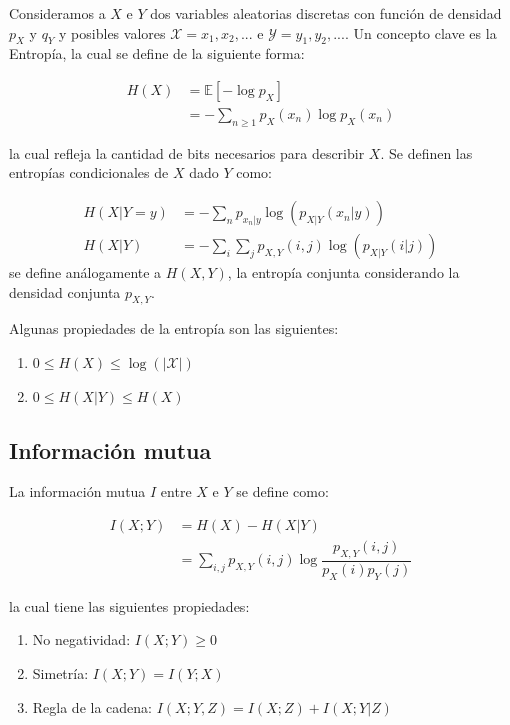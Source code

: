 Consideramos a $X$ e $Y$ dos variables aleatorias discretas con función de densidad $p_X$ y $q_Y$ y posibles valores $\mathcal{X}=x_1,x_2,...$ e $\mathcal{Y}=y_1,y_2,...$. Un concepto clave es la Entropía, la cual se define de la siguiente forma:

\begin{align*}
    H(X)&=\mathbb{E}[-\log p_X]\\
    &=-\sum\limits_{n\geq 1}p_X(x_n)\log p_X(x_n)
\end{align*}

la cual refleja la cantidad de bits necesarios para describir $X$. Se definen las entropías condicionales de $X$ dado $Y$ como:

\begin{align*}
    H(X|Y=y)&=-\sum\limits_{n}p_{x_n|y}\log (p_{X|Y}(x_n|y))\\
    H(X|Y)&=-\sum\limits_i\sum\limits_j p_{X,Y}(i,j)\log (p_{X|Y}(i|j))
\end{align*}
se define análogamente a $H(X,Y)$, la entropía conjunta considerando la densidad conjunta $p_{X,Y}$.

\begin{prop}
Algunas propiedades de la entropía son las siguientes:

\begin{enumerate}
    \item $0\leq H(X)\leq \log (|\mathcal{X}|)$
    \item $0\leq H(X|Y)\leq H(X)$
\end{enumerate}

\end{prop}

\subsection{Información mutua}

La información mutua $I$ entre $X$ e $Y$ se define como:

\begin{align*}
    I(X;Y)&=H(X)-H(X|Y)\\
    &=\sum\limits_{i,j}p_{X,Y}(i,j)\log \dfrac{p_{X,Y}(i,j)}{p_X(i)p_Y(j)}
\end{align*}

la cual tiene las siguientes propiedades:

\begin{prop}

\begin{enumerate}
    \item No negatividad: $I(X;Y)\geq 0$
    \item Simetría: $I(X;Y)=I(Y;X)$
    \item Regla de la cadena: $I(X;Y,Z)=I(X;Z)+I(X;Y|Z)$
\end{enumerate}

\end{prop}

